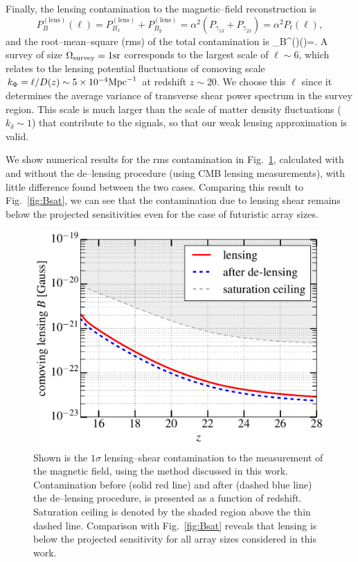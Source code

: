 Finally, the lensing contamination to the magnetic--field reconstruction is
\begin{equation}
P_B^{(\text{lens})}(\ell)=P^{(\text{lens})}_{B_x}+P^{(\text{lens})}_{B_y}=\alpha^2 (P_{\gamma_{13}}+P_{\gamma_{23}})=\alpha^2 P_t(\ell),
\end{equation}
and the root--mean--square (rms) of the total contamination is
\beq
\Delta_B^{()}(\ell)=.
\eeq
A survey of size $\Omega_{\rm survey}=1{\rm sr}$ corresponds to the largest scale of $\ell\sim 6$, which relates to the lensing potential fluctuations of comoving scale $k_\Phi=\ell/D(z)\sim 5\times 10^{-4}{\rm Mpc}^{-1}$ at redshift $z\sim 20$. We choose this $\ell$ since it determines the average variance of transverse shear power spectrum in the survey region. This scale is much larger than the scale of matter density fluctuations ($k_\delta\sim 1$) that contribute to the signals, so that our weak lensing approximation is valid.

We show numerical results for the rms contamination in Fig.~\ref{fig:lensing_B}, calculated with and without the de--lensing procedure (using CMB lensing measurements), with little difference found between the two cases. Comparing this result to Fig.~\ref{fig:Bsat}, we can see that the contamination due to lensing shear remains below the projected sensitivities even for the case of futuristic array sizes.
\begin{figure}[h]
\centering
\includegraphics[scale=0.4]{delensingB.pdf}
\caption{Shown is the $1\sigma$ lensing--shear contamination to the measurement of the magnetic field, using the method discussed in this work. Contamination before (solid red line) and after (dashed blue line) the de--lensing procedure, is presented as a function of redshift. Saturation ceiling is denoted by the shaded region above the thin dashed line. Comparison with Fig.~\ref{fig:Bsat} reveals that lensing is below the projected sensitivity for all array sizes considered in this work.}
\label{fig:lensing_B}
\end{figure}
